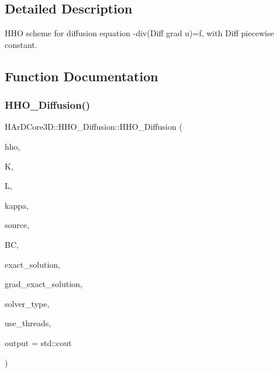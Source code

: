 \subsection{Detailed Description}
H\+HO scheme for diffusion equation -\/div(Diff grad u)=f, with Diff piecewise constant. 



\subsection{Function Documentation}
\mbox{\label{group__HHO__Diffusion_ga89f7078dcd1d4ffd848eed86cbfb00cf}} 
\subsubsection{\texorpdfstring{H\+H\+O\+\_\+\+Diffusion()}{HHO\_Diffusion()}}
{\footnotesize\ttfamily H\+Ar\+D\+Core3\+D\+::\+H\+H\+O\+\_\+\+Diffusion\+::\+H\+H\+O\+\_\+\+Diffusion (\begin{DoxyParamCaption}\item[{\hyperlink{classHArDCore3D_1_1HybridCore}{Hybrid\+Core} \&}]{hho,  }\item[{size\+\_\+t}]{K,  }\item[{int}]{L,  }\item[{\hyperlink{classHArDCore3D_1_1HHO__Diffusion_a640287c18811b16ef9136832e99879a1}{tensor\+\_\+function\+\_\+type}}]{kappa,  }\item[{\hyperlink{classHArDCore3D_1_1HHO__Diffusion_a2e1e24f77c08b2edbd8d836a91f6b08b}{source\+\_\+function\+\_\+type}}]{source,  }\item[{\hyperlink{classBoundaryConditions}{Boundary\+Conditions}}]{BC,  }\item[{\hyperlink{classHArDCore3D_1_1HHO__Diffusion_ab3104f23491ecb92d2701db651380148}{solution\+\_\+function\+\_\+type}}]{exact\+\_\+solution,  }\item[{\hyperlink{classHArDCore3D_1_1HHO__Diffusion_a35b1f1e3277f1d675b12d4e7533e3d23}{grad\+\_\+function\+\_\+type}}]{grad\+\_\+exact\+\_\+solution,  }\item[{std\+::string}]{solver\+\_\+type,  }\item[{bool}]{use\+\_\+threads,  }\item[{std\+::ostream \&}]{output = {\ttfamily std\+:\+:cout} }\end{DoxyParamCaption})}




